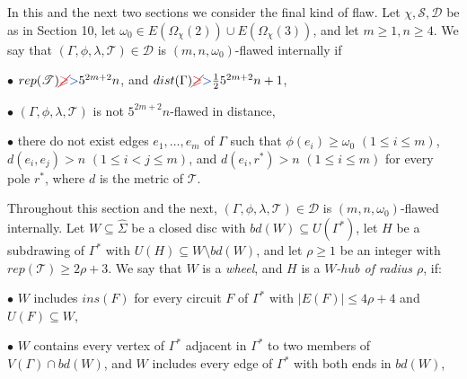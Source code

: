
In this and the next two sections we consider the final kind of flaw. Let $\chi, \mathscr{S}, \mathscr{D}$ be as in Section 10, let $\omega_0 \in E(\Omega_\chi(2)) \cup E(\Omega_\chi(3))$, and let $m \ge 1, n \ge 4$. We say that $(\Gamma, \phi, \lambda, \mathscr{T}) \in \mathscr{D}$ is $(m, n, \omega_0)$-flawed internally if

\hspace*{12pt}$\bullet$ $rep(\mathscr{T}) \delm{\ge}\fix{>} 5^{2m+2}n$, and $dist(\Gamma) \delm{\ge}\fix{>} \frac{1}{2} 5^{2m+2}n + 1$,

\hspace*{12pt}$\bullet$ $(\Gamma, \phi, \lambda, \mathscr{T})$ is not $5^{2m+2}n$-flawed in distance,

\hspace*{12pt}$\bullet$ there do not exist edges $e_1, \ldots, e_m$ of $\Gamma$ such that $\phi(e_i) \ge \omega_0$ $(1 \le i \le m)$, $d(e_i, e_j) > n$ $(1 \le i < j \le m)$, and $d(e_i, r^*) > n$ $(1 \le i \le m)$ for every pole $r^*$, where $d$ is the metric of $\mathscr{T}$.

Throughout this section and the next, $(\Gamma, \phi, \lambda, \mathscr{T}) \in \mathscr{D}$ is $(m, n, \omega_0)$-flawed internally. Let $W \subseteq \hat{\Sigma}$ be a closed disc with $bd(W) \subseteq U(\Gamma^*)$, let $H$ be a subdrawing of $\Gamma^*$ with $U(H) \subseteq W \setminus bd(W)$, and let $\rho \ge 1$ be an integer with $rep(\mathscr{T}) \ge 2\rho + 3$. We say that $W$ is a \textit{wheel}, and $H$ is a \textit{$W$-hub of radius $\rho$}, if:

\hspace*{12pt}$\bullet$ $W$ includes $ins(F)$ for every circuit $F$ of $\Gamma^*$ with $|E(F)| \le 4\rho + 4$ and $U(F) \subseteq W$,

\hspace*{12pt}$\bullet$ $W$ contains every vertex of $\Gamma^*$ adjacent in $\Gamma^*$ to two members of $V(\Gamma) \cap bd(W)$, and $W$ includes every edge of $\Gamma^*$ with both ends in $bd(W)$,

